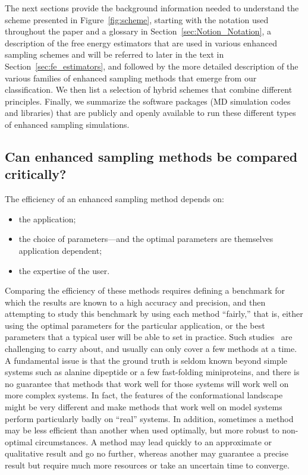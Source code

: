 \documentclass[9pt,review]{livecoms}
\begin{document}
The next sections provide the background information needed to understand the scheme presented in Figure~\ref{fig:scheme}, starting with the notation used throughout the paper and a glossary in Section~\ref{sec:Notion_Notation}, a description of the free energy estimators that are used in various enhanced sampling schemes and will be referred to later in the text in Section~\ref{sec:fe_estimators}, and followed by the more detailed description of the various families of enhanced sampling methods that emerge from our classification. We then list a selection of hybrid schemes that combine different principles. Finally, we summarize the software packages (MD simulation codes and libraries) that are publicly and openly available to run these different types of enhanced sampling simulations.


\subsection{Can enhanced sampling methods be compared critically?}
\label{sec:critical_comparison}

The efficiency of an enhanced sampling method depends on:
\begin{itemize}
 \item the application;
 \item the choice of parameters---and the optimal parameters are themselves application dependent;
 \item the expertise of the user.
\end{itemize}

Comparing the efficiency of these methods requires defining a benchmark for which the results are known to a high accuracy and precision, and then attempting to study this benchmark by using each method ``fairly,'' that is, either using the optimal parameters for the particular application, or the best parameters that a typical user will be able to set in practice. Such studies~\cite{Rizzi:JCAMD:2020a,Hrustak:JCP:2018} are challenging to carry about, and usually can only cover a few methods at a time.  A fundamental issue is that the ground truth is seldom known beyond simple systems such as alanine dipeptide or a few fast-folding miniproteins, and there is no guarantee that methods that work well for those systems will work well on more complex systems. In fact, the features of the conformational landscape might be very different and make methods that work well on model systems perform particularly badly on ``real'' systems. In addition, sometimes a method may be less efficient than another when used optimally, but more robust to non-optimal circumstances.
A method may lead quickly to an approximate or qualitative result and go no further, whereas another may guarantee a precise result but require much more resources or take an uncertain time to converge.
\end{document}
